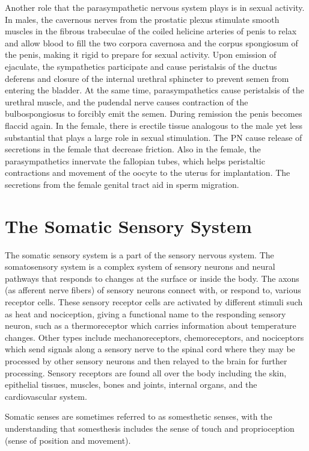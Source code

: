 Another role that the parasympathetic nervous system plays is in sexual activity. In males, the cavernous nerves from the prostatic plexus stimulate smooth muscles in the fibrous trabeculae of the coiled helicine arteries of penis to relax and allow blood to fill the two corpora cavernosa and the corpus spongiosum of the penis, making it rigid to prepare for sexual activity. Upon emission of ejaculate, the sympathetics participate and cause peristalsis of the ductus deferens and closure of the internal urethral sphincter to prevent semen from entering the bladder. At the same time, parasympathetics cause peristalsis of the urethral muscle, and the pudendal nerve causes contraction of the bulbospongiosus to forcibly emit the semen. During remission the penis becomes flaccid again. In the female, there is erectile tissue analogous to the male yet less substantial that plays a large role in sexual stimulation. The PN cause release of secretions in the female that decrease friction. Also in the female, the parasympathetics innervate the fallopian tubes, which helps peristaltic contractions and movement of the oocyte to the uterus for implantation. The secretions from the female genital tract aid in sperm migration.

\hypertarget{the-somatic-sensory-system}{%
\chapter{The Somatic Sensory System}\label{the-somatic-sensory-system}}

The somatic sensory system is a part of the sensory nervous system. The somatosensory system is a complex system of sensory neurons and neural pathways that responds to changes at the surface or inside the body. The axons (as afferent nerve fibers) of sensory neurons connect with, or respond to, various receptor cells. These sensory receptor cells are activated by different stimuli such as heat and nociception, giving a functional name to the responding sensory neuron, such as a thermoreceptor which carries information about temperature changes. Other types include mechanoreceptors, chemoreceptors, and nociceptors which send signals along a sensory nerve to the spinal cord where they may be processed by other sensory neurons and then relayed to the brain for further processing. Sensory receptors are found all over the body including the skin, epithelial tissues, muscles, bones and joints, internal organs, and the cardiovascular system.

Somatic senses are sometimes referred to as somesthetic senses, with the understanding that somesthesis includes the sense of touch and proprioception (sense of position and movement).

